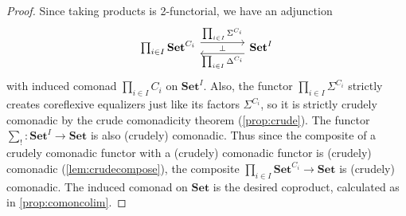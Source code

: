 \documentclass[11pt, oneside, article]{memoir}
\theoremstyle{plain}
\theoremstyle{definition}
\theoremstyle{remark}
\newcommand{\bang}{\mathrm{!}}
\newcommand{\namedcat}[1]{\mathbf{#1}}
\newcommand{\Set}{\namedcat{Set}}
\newcommand{\Con}{\namedcat{Cmd}^\natural}
\newcommand{\ConO}{\Con}
\newcommand{\ConOSet}{\ConO}
\newcommand{\CoalgOn}[2]{{#2}^{#1}}
\newcommand{\CoalgSet}[1]{\CoalgOn{#1}{\Set}}
\newcommand{\carr}{\Sigma}
\newcommand{\rcarr}{\Delta}
\newcommand{\car}[1]{\carr^{#1}}
\newcommand{\rcar}[1]{\rcarr^{#1}}
\newcommand{\cmnd}[1]{{#1}}
\newcommand{\cC}{\cmnd{C}}
\begin{document}
\begin{proof}
  Since taking products is 2-functorial, we have an adjunction
  \[
    \begin{tikzcd}[column sep=40pt]
      \prod_{i \in I}\CoalgSet{\cC_i}\ar[r, shift left=5pt, "\prod_{i \in I} \car{\cC_i}"]\ar["\bot"{anchor=center},r,draw=none]&
      \Set^I\ar[l, shift left=5pt, "\prod_{i \in I} \rcar{\cC_i}"]
    \end{tikzcd}
  \]
  with induced comonad $\prod_{i \in I}\cC_i$ on $\Set^I$. Also, the
  functor $\prod_{i \in I} \car{\cC_i}$ strictly creates coreflexive
  equalizers just like its factors $\car{\cC_i}$, so it is strictly
  crudely comonadic by the crude comonadicity theorem
  (\cref{prop:crude}). The functor
  $\sum_{\bang} \colon \Set^I \to \Set$ is also (crudely)
  comonadic. Thus since the composite of a crudely comonadic functor
  with a (crudely) comonadic functor is (crudely) comonadic
  (\cref{lem:crudecompose}), the composite
  $\prod_{i \in I}\CoalgSet{\cC_i} \to \Set$ is (crudely)
  comonadic. The induced comonad on $\Set$ is the desired coproduct,
  calculated as in \cref{prop:comoncolim}.
\end{proof}

\end{document}
